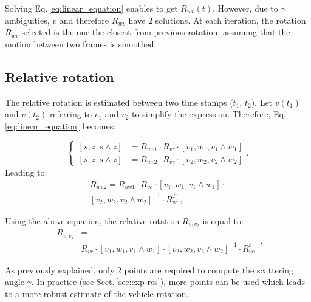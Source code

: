 Solving Eq.\,\eqref{eq:linear_equation} enables to get $R_{wv}(t)$. However, due to
$\gamma$ ambiguities, $v$ and therefore $R_{wv}$ have 2 solutions. At each
iteration, the rotation $R_{wv}$ selected is the one the closest from previous
rotation, assuming that the motion between two frames is smoothed.

\subsection{Relative rotation}
\label{sec:rel-rot}

The relative rotation is estimated between two time stamps ($t_1$,
$t_2$). Let $v(t_1)$ and $v(t_2)$ referring to $v_1$ and $v_2$ to simplify the
expression. Therefore, Eq.\,\eqref{eq:linear_equation} becomes:

\begin{equation}
\begin{cases}
\left[s,z,s\wedge z\right] & =R_{wv1}\cdot R_{vc}\cdot\left[v_{1},w_{1},v_{1}\wedge w_{1}\right]\\
\left[s,z,s\wedge z\right] & =R_{wv2}\cdot R_{vc}\cdot\left[v_{2},w_{2},v_{2}\wedge w_{2}\right]
\end{cases}.
\label{eq:rel-linear_equation}
\end{equation}
Leading to:
\begin{equation}
  \begin{split}
R_{wv2}=R_{wv1}\cdot R_{vc}\cdot\left[v_{1},w_{1},v_{1}\wedge
  w_{1}\right]\cdot \\
\left[v_{2},w_{2},v_{2}\wedge w_{2}\right]^{-1} \cdot R_{vc}^{T} \ ,
\label{eq:relative_equation}\end{split}
\end{equation}

Using the above equation, the relative rotation $R_{v_{1}v_{2}}$ is equal to:
\begin{equation}
\begin{split}
  R_{v_{1}v_{2}} &= \\
   & R_{vc}\cdot\left[v_{1},w_{1},v_{1}\wedge
  w_{1}\right]\cdot\left[v_{2},w_{2},v_{2}\wedge w_{2}\right]^{-1}\cdot
R_{vc}^{t}
\end{split} \ .
\label{eq:final-relative}
\end{equation}

As previously explained, only 2 points are required to compute the scattering
angle $\gamma$. In practice (see Sect.\,\ref{sec:exp-res}), more points can be
used which leads to a more robust estimate of the vehicle rotation.

